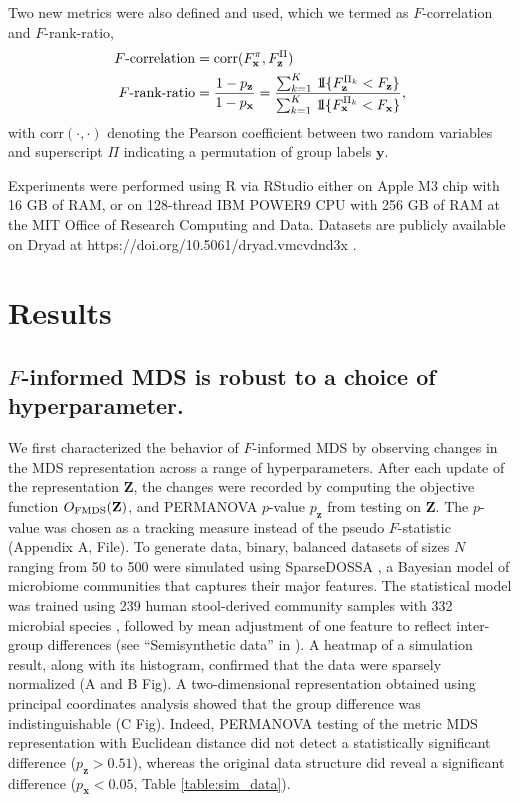 \documentclass[10pt,letterpaper]{article}
\newcommand{\1}{{\rm 1}\kern-0.24em{\rm I}}
\begin{document}
Two new metrics were also defined and used, which we termed as $F$-correlation and $F$-rank-ratio,
\begin{equation}
\begin{aligned}
    F\text{-correlation} &= \text{corr}(F_\mathbf{x}^\pi, F_\mathbf{z}^\Pi) \\
    F\text{-rank-ratio} &= \frac{1-p_\mathbf{z}}{1-p_\mathbf{x}} = \frac{\sum_{k=1}^K\,\1\{F_\mathbf{z}^{\Pi_k} < F_\mathbf{z}\}}{\sum_{k=1}^K\,\1\{F_\mathbf{x}^{\Pi_k} < F_\mathbf{x}\}},
    \label{eq:def_f_metrics}
\end{aligned}
\end{equation}
with $\text{corr}(\cdot,\cdot)$ denoting the Pearson coefficient between two random variables and superscript $\Pi$ indicating a permutation of group labels $\mathbf{y}$.

Experiments were performed using R via RStudio either on Apple M3 chip with 16 GB of RAM, or on 128-thread IBM POWER9 CPU with 256 GB of RAM at the MIT Office of Research Computing and Data. Datasets are publicly available on Dryad at https://doi.org/10.5061/dryad.vmcvdnd3x \cite{Kim25}.



\section*{Results}
\subsection*{$F$-informed MDS is robust to a choice of hyperparameter.}
We first characterized the behavior of $F$-informed MDS by observing changes in the MDS representation across a range of hyperparameters. After each update of the representation $\mathbf{Z}$, the changes were recorded by computing the objective function $O_{\rm FMDS}(\mathbf{Z})$, and PERMANOVA $p$-value $p_\mathbf{z}$ from testing on $\mathbf{Z}$. The $p$-value was chosen as a tracking measure instead of the pseudo $F$-statistic (Appendix A,  File). To generate data, binary, balanced datasets of sizes $N$ ranging from 50 to 500 were simulated using SparseDOSSA \cite{Ma21}, a Bayesian model of microbiome communities that captures their major features. The statistical model was trained using 239 human stool-derived community samples with 332 microbial species \cite{Lloyd17}, followed by mean adjustment of one feature to reflect inter-group differences (see ``Semisynthetic data'' in ). A heatmap of a simulation result, along with its histogram, confirmed that the data were sparsely normalized (A and B Fig). A two-dimensional representation obtained using principal coordinates analysis showed that the group difference was indistinguishable (C Fig). Indeed, PERMANOVA testing of the metric MDS representation with Euclidean distance did not detect a statistically significant difference ($p_\mathbf{z}>0.51$), whereas the original data structure did reveal a significant difference ($p_\mathbf{x}<0.05$, Table \ref{table:sim_data}).
\end{document}
